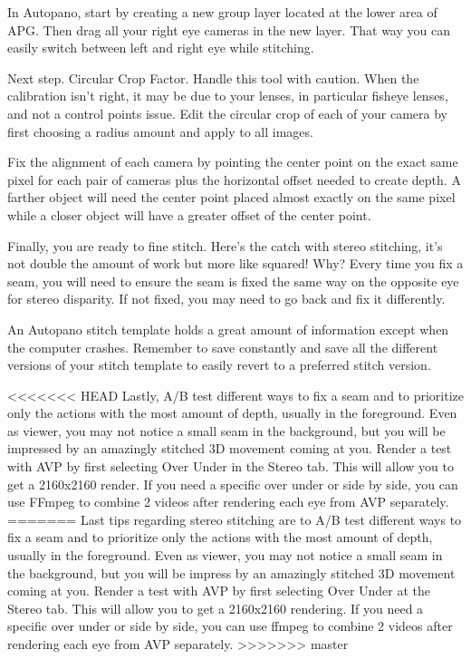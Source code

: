\begin{fullwidth}

In Autopano, start by creating a new group layer located at the lower area of APG. Then drag all your right eye cameras in the new layer. That way you can easily switch between left and right eye while stitching.


Next step. Circular Crop Factor. Handle this tool with caution. When the calibration isn't right, it may be due to your lenses, in particular fisheye lenses, and not a control points issue. Edit the circular crop of each of your camera by first choosing a radius amount and apply to all images. 


Fix the alignment of each camera by pointing the center point on the exact same pixel for each pair of cameras plus the horizontal offset needed to create depth. A farther object will need the center point placed almost exactly on the same pixel while a closer object will have a greater offset of the center point. 



Finally, you are ready to fine stitch. Here’s the catch with stereo stitching, it’s not double the amount of work but more like squared! Why? Every time you fix a seam, you will need to ensure the seam is fixed the same way on the opposite eye for stereo disparity. If not fixed, you may need to go back and fix it differently. 

An Autopano stitch template holds a great amount of information except when the computer crashes.  Remember to save constantly and save all the different versions of your stitch template to easily revert to a preferred stitch version. 
\clearpage


<<<<<<< HEAD
Lastly, A/B test different ways to fix a seam and to prioritize only the actions with the most amount of depth, usually in the foreground. Even as viewer, you may not notice a small seam in the background, but you will be impressed by an amazingly stitched 3D movement coming at you. Render a test with AVP by first selecting Over Under in the Stereo tab. This will allow you to get a 2160x2160 render. If you need a specific over under or side by side, you can use FFmpeg to combine 2 videos after rendering each eye from AVP separately.
=======
Last tips regarding stereo stitching are to A/B test different ways to fix a seam and to prioritize only the actions with the most amount of depth, usually in the foreground. Even as viewer, you may not notice a small seam in the background, but you will be impress by an amazingly stitched 3D movement coming at you. Render a test with AVP by first selecting Over Under at the Stereo tab. This will allow you to get a 2160x2160 rendering. If you need a specific over under or side by side, you can use ffmpeg to combine 2 videos after rendering each eye from AVP separately.
>>>>>>> master


\end{fullwidth}
